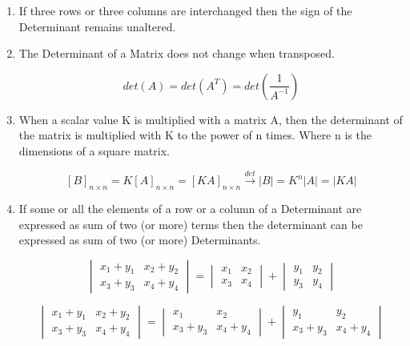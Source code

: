 \begin{enumerate}
    $$ |A| = \Delta $$
    $$ |B| = -\Delta $$

    \item If three rows or three columns are interchanged then the sign of the Determinant remains unaltered.

    \item The Determinant of a Matrix does not change when transposed.

    $$ det(A) = det(A^T) = det\left(\frac{1}{A^{-1}}\right) $$

    \item When a scalar value K is multiplied with a matrix A, then the determinant of the matrix is multiplied with K to the power of n times. Where n is the dimensions of a square matrix.

    $$ [B]_{n \times n} = K[A]_{n \times n} = [KA]_{n \times n} \xrightarrow{det} |B| = K^n|A| = |KA| $$

    \item If some or all the elements of a row or a column of a Determinant are expressed as sum of two (or more) terms then the determinant can be expressed as sum of two (or more) Determinants.

    $$  \begin{vmatrix}
        x_1 + y_1 & x_2 + y_2 \\
        x_3 + y_3 & x_4 + y_4
        \end{vmatrix} =
        \begin{vmatrix}
        x_1 & x_2 \\
        x_3 & x_4
        \end{vmatrix} +
        \begin{vmatrix}
        y_1 & y_2 \\
        y_3 & y_4
        \end{vmatrix}
    $$

    $$  \begin{vmatrix}
        x_1 + y_1 & x_2 + y_2 \\
        x_3 + y_3 & x_4 + y_4
        \end{vmatrix} =
        \begin{vmatrix}
        x_1 & x_2 \\
        x_3 + y_3 & x_4 + y_4
        \end{vmatrix} +
        \begin{vmatrix}
        y_1 & y_2 \\
        x_3 + y_3 & x_4 + y_4
        \end{vmatrix}
    $$


\end{enumerate}
